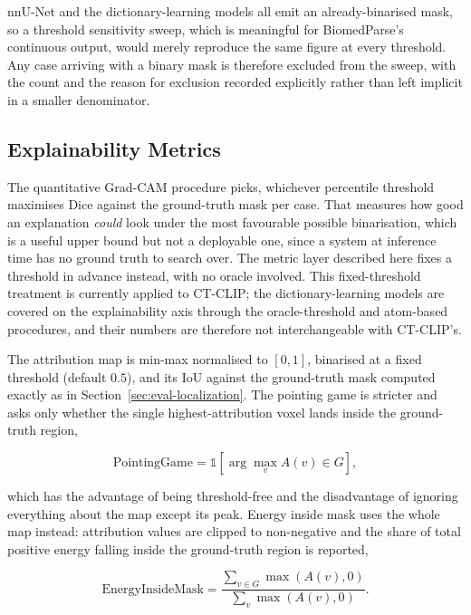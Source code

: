 nnU-Net and the dictionary-learning models all emit an already-binarised mask, so a
threshold sensitivity sweep, which is meaningful for BiomedParse's continuous output, would
merely reproduce the same figure at every threshold. Any case arriving with a binary mask is
therefore excluded from the sweep, with the count and the reason for exclusion recorded
explicitly rather than left implicit in a smaller denominator.

\subsection{Explainability Metrics}
\label{sec:eval-explainability}

The quantitative Grad-CAM procedure picks, whichever percentile threshold maximises Dice against the ground-truth mask per case.
That measures how good an explanation \emph{could} look under the most favourable possible
binarisation, which is a useful upper bound but not a deployable one, since a system at
inference time has no ground truth to search over. The metric layer described here fixes a
threshold in advance instead, with no oracle involved. This fixed-threshold treatment is
currently applied to CT-CLIP; the dictionary-learning models are covered on the
explainability axis through the oracle-threshold and atom-based procedures,
and their numbers are therefore not interchangeable with CT-CLIP's.

The attribution map is min-max normalised to $[0,1]$, binarised at a fixed threshold
(default $0.5$), and its IoU against the ground-truth mask computed exactly as in
Section~\ref{sec:eval-localization}. The pointing game is stricter and asks only whether the
single highest-attribution voxel lands inside the ground-truth region,

\begin{equation}[Pointing Game]
\mathrm{PointingGame} = \mathbb{1}\!\left[\arg\max_{v} A(v) \in G\right],
\label{eq:pointing-game}
\end{equation}

which has the advantage of being threshold-free and the disadvantage of ignoring everything
about the map except its peak. Energy inside mask uses the whole map instead: attribution
values are clipped to non-negative and the share of total positive energy falling inside the
ground-truth region is reported,

\begin{equation}[Energy Inside Mask]
\mathrm{EnergyInsideMask} = \frac{\sum_{v \in G} \max(A(v),0)}{\sum_{v} \max(A(v),0)}.
\label{eq:energy-inside-mask}
\end{equation}

